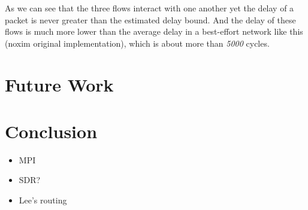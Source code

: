 \documentclass[conference, twocolumn]{IEEEtran}
\theoremstyle{definition}
\begin{document}
As we can see that the three flows interact with one another yet the delay of a
packet is never greater than the estimated delay bound. And the delay of these
flows is much more lower than the average delay in a best-effort network like
this (noxim original implementation), which is about more than {\em 5000}
cycles.

\section{Future Work}
\section{Conclusion}
\begin{itemize}
  \item MPI
  \item SDR?
  \item Lee's routing
\end{itemize}




\end{document}
